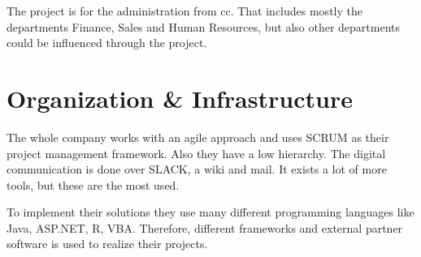The project is for the administration from \gls{cc}. That includes mostly the departments Finance, Sales and Human Resources, but also other departments could be influenced through the project.

\section{Organization \& Infrastructure}
The whole company works with an agile approach and uses \gls{SCRUM} as their project management framework. Also they have a low hierarchy. The digital communication is done over SLACK, a wiki and mail. It exists a lot of more tools, but these are the most used.

To implement their solutions they use many different programming languages like Java, ASP.NET, R, VBA. Therefore, different frameworks and external partner software is used to realize their projects.